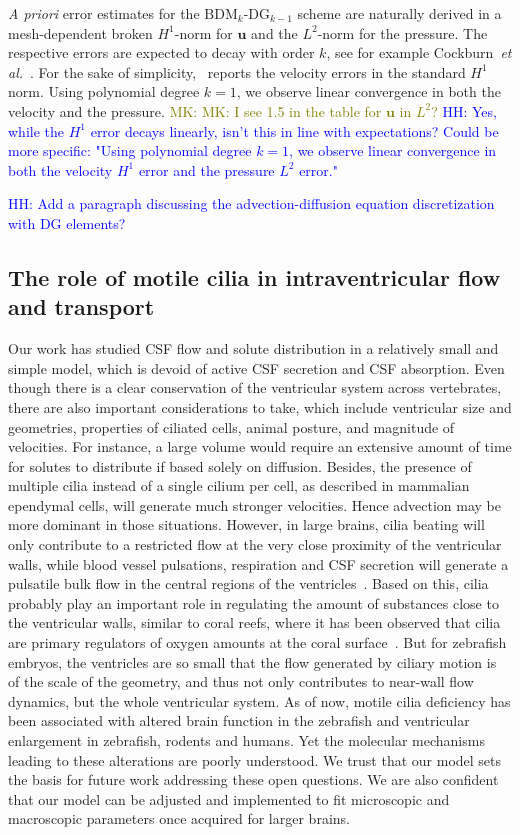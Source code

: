 \documentclass[fleqn]{wlscirep}
\newcommand{\uu}{\mathbf{u}}
\newcommand{\lyng}[1]{\textcolor{blue}{#1}}
\newcommand{\mk}[1]{\textcolor{olive}{MK: #1}}
\begin{document}
\emph{A priori} error estimates for the $\mathrm{BDM}_k$-$\mathrm{DG}_{k-1}$ scheme are naturally 
derived in a mesh-dependent broken $H^1$-norm for $\uu$ and the $L^2$-norm for the pressure. The respective 
errors are expected to decay with order $k$, see for example Cockburn~\emph{et al.}~\cite{Cockburn2005AEquations}. For the sake of simplicity,~ reports the velocity errors in the standard $H^1$ norm. Using polynomial degree  
$k=1$, we observe linear convergence in both the velocity and the pressure.   
\mk{MK: I see 1.5 in the table for $\uu$ in $L^2$?} \lyng{HH: Yes, while the $H^1$ error decays linearly, isn't this in line with expectations? Could be more specific: "Using polynomial degree 
$k=1$, we observe linear convergence in both the velocity $H^1$ error and the pressure $L^2$ error."}

\lyng{HH: Add a paragraph discussing the advection-diffusion equation discretization with DG elements?}

\subsection*{The role of motile cilia in intraventricular flow and transport}
Our work has studied CSF flow and solute distribution
in a relatively small and simple model, which is devoid of
active CSF secretion and CSF absorption. Even though there is
a clear conservation of the ventricular system across vertebrates,
there are also important considerations to take, which include
ventricular size and geometries, properties of ciliated cells,
animal posture, and magnitude of velocities. For instance, a large
volume would require an extensive amount of time for solutes to distribute
if based solely on diffusion. Besides, the presence of multiple cilia
instead of a single cilium per cell, as described in mammalian ependymal cells,
will generate much stronger velocities. Hence advection may be more
dominant in those situations. However, in large brains, cilia beating will
only contribute to a restricted flow at the very close proximity of the ventricular walls,
while blood vessel pulsations, respiration and CSF secretion will generate a
pulsatile bulk flow in the central regions of the ventricles~\cite{Siyahhan2014FlowVentricles}.
Based on this, cilia probably play an important role in regulating the
amount of substances close to the ventricular walls, similar to coral
reefs, where it has been observed that cilia are primary regulators of
oxygen amounts at the coral surface~\cite{Pacherres2022CiliaryProduction}.
But for zebrafish embryos, the ventricles are so small that the flow
generated by ciliary motion is of the scale of the geometry, and thus not
only contributes to near-wall flow dynamics, but the whole ventricular system.
As of now, motile cilia deficiency has been associated with altered brain function
in the zebrafish and ventricular enlargement in zebrafish, rodents and humans.
Yet the molecular mechanisms leading to these alterations are poorly understood.
We trust that our model sets the basis for future work addressing these open questions.
We are also confident that our model can be adjusted and implemented to fit
microscopic and macroscopic parameters once acquired for larger brains.
\end{document}
